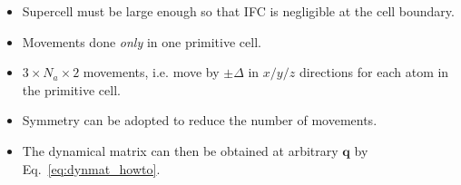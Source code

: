 \begin{frame}[allowframebreaks]
\begin{enumerate}
\begin{center}
    \end{center}

    \begin{itemize}
    \item Supercell must be large enough so that IFC is negligible at the cell
      boundary.
    \item Movements done \emph{only} in one primitive cell.
      
    \item $3\times N_a\times 2$ movements, i.e. move by $\pm \Delta$ in
      $x/y/z$ directions for each atom in the primitive cell.
      
    \item Symmetry can be adopted to reduce the number of movements.

    \item The dynamical matrix can then be obtained at arbitrary
      $\boldsymbol{q}$ by Eq.~\ref{eq:dynmat_howto}.

    \end{itemize}


\end{enumerate}
\end{frame}
